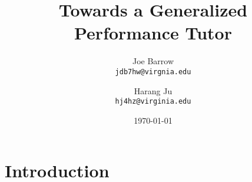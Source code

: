\documentclass[twocolumn]{article}
\title{Towards a Generalized Performance Tutor}
\author{
  Joe Barrow\\
  \texttt{jdb7hw@virgnia.edu}
  \and
  Harang Ju\\
  \texttt{hj4hz@virginia.edu}}
\date{\today}
\begin{document}
\maketitle

\begin{abstract}
\end{abstract}

\section{Introduction}
\end{document}

